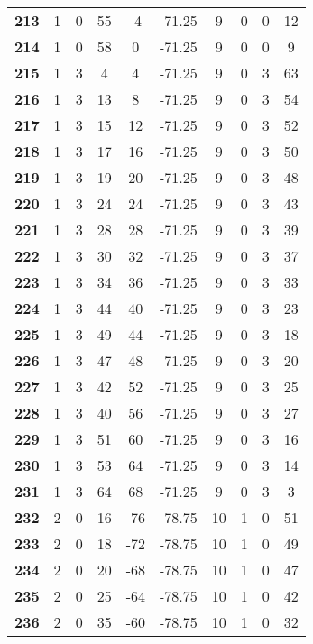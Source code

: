 \documentclass{article}%
\begin{document}
\begin{longtable}{cccccccccc}
        \textbf{213} & 1 & 0 & 55 & -4 & -71.25 & 9 & 0 & 0 & 12 \\ 
        \textbf{214} & 1 & 0 & 58 & 0 & -71.25 & 9 & 0 & 0 & 9 \\ 
        \textbf{215} & 1 & 3 & 4 & 4 & -71.25 & 9 & 0 & 3 & 63 \\ 
        \textbf{216} & 1 & 3 & 13 & 8 & -71.25 & 9 & 0 & 3 & 54 \\ 
        \textbf{217} & 1 & 3 & 15 & 12 & -71.25 & 9 & 0 & 3 & 52 \\ 
        \textbf{218} & 1 & 3 & 17 & 16 & -71.25 & 9 & 0 & 3 & 50 \\ 
        \textbf{219} & 1 & 3 & 19 & 20 & -71.25 & 9 & 0 & 3 & 48 \\ 
        \textbf{220} & 1 & 3 & 24 & 24 & -71.25 & 9 & 0 & 3 & 43 \\ 
        \textbf{221} & 1 & 3 & 28 & 28 & -71.25 & 9 & 0 & 3 & 39 \\ 
        \textbf{222} & 1 & 3 & 30 & 32 & -71.25 & 9 & 0 & 3 & 37 \\ 
        \textbf{223} & 1 & 3 & 34 & 36 & -71.25 & 9 & 0 & 3 & 33 \\ 
        \textbf{224} & 1 & 3 & 44 & 40 & -71.25 & 9 & 0 & 3 & 23 \\ 
        \textbf{225} & 1 & 3 & 49 & 44 & -71.25 & 9 & 0 & 3 & 18 \\ 
        \textbf{226} & 1 & 3 & 47 & 48 & -71.25 & 9 & 0 & 3 & 20 \\ 
        \textbf{227} & 1 & 3 & 42 & 52 & -71.25 & 9 & 0 & 3 & 25 \\ 
        \textbf{228} & 1 & 3 & 40 & 56 & -71.25 & 9 & 0 & 3 & 27 \\ 
        \textbf{229} & 1 & 3 & 51 & 60 & -71.25 & 9 & 0 & 3 & 16 \\ 
        \textbf{230} & 1 & 3 & 53 & 64 & -71.25 & 9 & 0 & 3 & 14 \\ 
        \textbf{231} & 1 & 3 & 64 & 68 & -71.25 & 9 & 0 & 3 & 3 \\ 
        \textbf{232} & 2 & 0 & 16 & -76 & -78.75 & 10 & 1 & 0 & 51 \\ 
        \textbf{233} & 2 & 0 & 18 & -72 & -78.75 & 10 & 1 & 0 & 49 \\ 
        \textbf{234} & 2 & 0 & 20 & -68 & -78.75 & 10 & 1 & 0 & 47 \\ 
        \textbf{235} & 2 & 0 & 25 & -64 & -78.75 & 10 & 1 & 0 & 42 \\ 
        \textbf{236} & 2 & 0 & 35 & -60 & -78.75 & 10 & 1 & 0 & 32 \\ 

\end{longtable}
\end{document}

